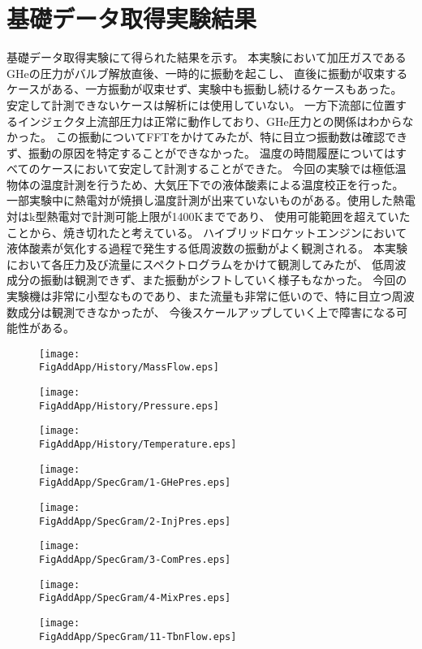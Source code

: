\section*{基礎データ取得実験結果}
基礎データ取得実験にて得られた結果を示す。
本実験において加圧ガスであるGHeの圧力がバルブ解放直後、一時的に振動を起こし、
直後に振動が収束するケースがある、一方振動が収束せず、実験中も振動し続けるケースもあった。
安定して計測できないケースは解析には使用していない。
一方下流部に位置するインジェクタ上流部圧力は正常に動作しており、GHe圧力との関係はわからなかった。
この振動についてFFTをかけてみたが、特に目立つ振動数は確認できず、振動の原因を特定することができなかった。
温度の時間履歴についてはすべてのケースにおいて安定して計測することができた。
今回の実験では極低温物体の温度計測を行うため、大気圧下での液体酸素による温度校正を行った。
一部実験中に熱電対が焼損し温度計測が出来ていないものがある。使用した熱電対はk型熱電対で計測可能上限が1400Kまでであり、
使用可能範囲を超えていたことから、焼き切れたと考えている。
ハイブリッドロケットエンジンにおいて液体酸素が気化する過程で発生する低周波数の振動がよく観測される。
本実験において各圧力及び流量にスペクトログラムをかけて観測してみたが、
低周波成分の振動は観測できず、また振動がシフトしていく様子もなかった。
今回の実験機は非常に小型なものであり、また流量も非常に低いので、特に目立つ周波数成分は観測できなかったが、
今後スケールアップしていく上で障害になる可能性がある。
\newcommand{\FigAddApp}{./src/Appendix/Figure}
\begin{figure}
\centering
\texttt{[image: \\FigAddApp/History/MassFlow.eps]}
\caption{}
\end{figure}
\begin{figure}
\centering
\texttt{[image: \\FigAddApp/History/Pressure.eps]}
\caption{}
\end{figure}
\begin{figure}
\centering
\texttt{[image: \\FigAddApp/History/Temperature.eps]}
\caption{}
\end{figure}
\begin{figure}
\centering
\texttt{[image: \\FigAddApp/SpecGram/1-GHePres.eps]}
\caption{}
\end{figure}
\begin{figure}
\centering
\texttt{[image: \\FigAddApp/SpecGram/2-InjPres.eps]}
\caption{}
\end{figure}
\begin{figure}
\centering
\texttt{[image: \\FigAddApp/SpecGram/3-ComPres.eps]}
\caption{}
\end{figure}
\begin{figure}
\centering
\texttt{[image: \\FigAddApp/SpecGram/4-MixPres.eps]}
\caption{}
\end{figure}
\begin{figure}
\centering
\texttt{[image: \\FigAddApp/SpecGram/11-TbnFlow.eps]}
\caption{}
\end{figure}
